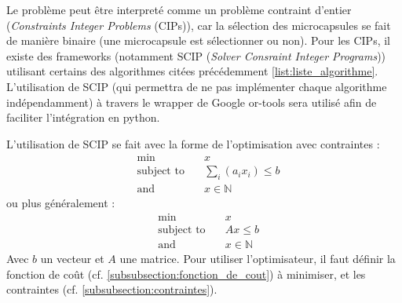 Le problème peut être interpreté comme un problème contraint d'entier (\textit{Constraints Integer Problems} (CIPs)), car la sélection des microcapsules se fait de manière binaire (une microcapsule est sélectionner ou non). Pour les CIPs, il existe des frameworks (notamment SCIP (\textit{Solver Consraint Integer Programs})) utilisant certains des algorithmes citées précédemment \autoref{list:liste_algorithme}. L'utilisation de SCIP (qui permettra de ne pas implémenter chaque algorithme indépendamment) à travers le wrapper de Google or-tools sera utilisé afin de faciliter l'intégration en python. 

L'utilisation de SCIP se fait avec la forme de l'optimisation avec contraintes :
\begin{align*}
    &\min\quad &x \\
    &\text{subject to}\quad &\sum_{i}\left( a_ix_i\right) \leq b \\
    &\text{and}\quad &x \in \mathbb{N}
\end{align*}
ou plus généralement : 
\begin{align*}
    &\min\quad &x \\
    &\text{subject to}\quad &Ax \leq b \\
    &\text{and}\quad &x \in \mathbb{N}
\end{align*}
Avec $b$ un vecteur et $A$ une matrice. Pour utiliser l'optimisateur, il faut définir la fonction de coût (cf. \autoref{subsubsection:fonction_de_cout}) à minimiser, et les contraintes (cf. \autoref{subsubsection:contraintes}).

